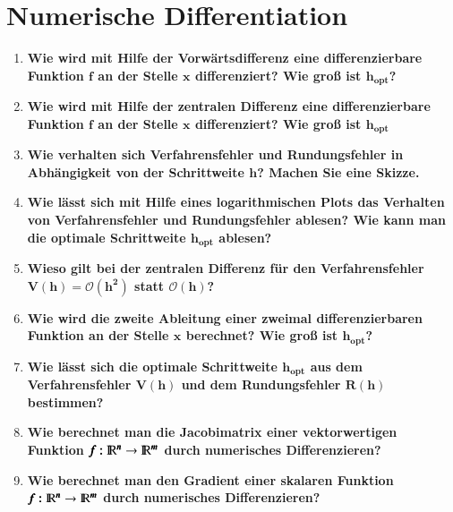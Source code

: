\section{Numerische Differentiation}
	\begin{enumerate}
		\item \textbf{Wie wird mit Hilfe der Vorwärtsdifferenz eine differenzierbare Funktion $\pmb{f}$ an der Stelle $\pmb{x}$ differenziert? Wie groß ist $\pmb{h_{opt}}$?}\\
		
		\item \textbf{Wie wird mit Hilfe der zentralen Differenz eine differenzierbare Funktion $\pmb{f}$ an der Stelle $\pmb{x}$ differenziert? Wie groß ist $\pmb{h_{opt}}$}\\
		\item \textbf{Wie verhalten sich Verfahrensfehler und Rundungsfehler in Abhängigkeit von der Schrittweite $\pmb{h}$? Machen Sie eine Skizze.}\\
		\item \textbf{Wie lässt sich mit Hilfe eines logarithmischen Plots das Verhalten von Verfahrensfehler und Rundungsfehler ablesen? Wie kann man die optimale Schrittweite $\pmb{h_{opt}}$ ablesen?}\\
		\item \textbf{Wieso gilt bei der zentralen Differenz für den Verfahrensfehler $\pmb{V(h)=\mathcal{O}(h^2)}$ statt $\pmb{\mathcal{O}(h)}$?}\\
		\item \textbf{Wie wird die zweite Ableitung einer zweimal differenzierbaren Funktion an der Stelle $\pmb{x}$ berechnet? Wie groß ist $\pmb{h_{opt}}$?}\\
		\item \textbf{Wie lässt sich die optimale Schrittweite $\pmb{h_{opt}}$ aus dem Verfahrensfehler $\pmb{V(h)}$ und dem Rundungsfehler $\pmb{R(h)}$ bestimmen?}\\
		\item \textbf{Wie berechnet man die Jacobimatrix einer vektorwertigen Funktion $\pmb{f:}{\rm I\!R}\pmb{^n} \rightarrow {\rm I\!R}\pmb{^m}$ durch numerisches Differenzieren?}\\
		\item \textbf{Wie berechnet man den Gradient einer skalaren Funktion $\pmb{f:}{\rm I\!R}\pmb{^n} \rightarrow {\rm I\!R}\pmb{^m}$ durch numerisches Differenzieren?}\\
	\end{enumerate}